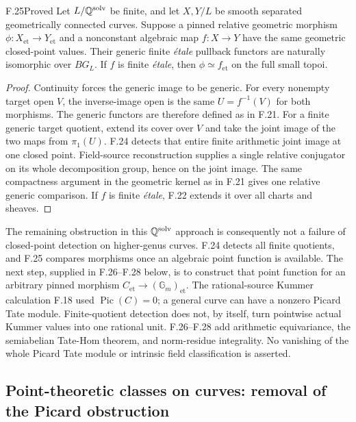 \begin{claim}{F.25}{Proved}
Let $L/\mathbb Q^{\mathrm{solv}}$ be finite, and let $X,Y/L$ be
smooth separated geometrically connected curves. Suppose a pinned
relative geometric morphism $\phi:X_{\mathrm{et}}\to
Y_{\mathrm{et}}$ and a nonconstant algebraic map $f:X\to Y$
have the same geometric closed-point values. Their generic
finite \emph{\'etale} pullback functors are naturally isomorphic
over $BG_L$. If $f$ is finite \emph{\'etale}, then
$\phi\simeq f_{\mathrm{et}}$ on the full small topoi.
\end{claim}
\begin{proof}
Continuity forces the generic image to be generic. For every
nonempty target open $V$, the inverse-image open is the same
$U=f^{-1}(V)$ for both morphisms. The generic functors are
therefore defined as in F.21. For a finite generic target
quotient, extend its cover over $V$ and take the joint image
of the two maps from $\pi_1(U)$. F.24 detects that entire
finite arithmetic joint image at one closed point. Field-source
reconstruction supplies a single relative conjugator on its
whole decomposition group, hence on the joint image. The same
compactness argument in the geometric kernel as in F.21 gives
one relative generic comparison. If $f$ is finite
\emph{\'etale}, F.22 extends it over all charts and sheaves.
\end{proof}

The remaining obstruction in this $\mathbb Q^{\mathrm{solv}}$ approach
is consequently not a failure of closed-point detection on
higher-genus curves. F.24 detects
all finite quotients, and F.25 compares morphisms once an
algebraic point function is available. The next step, supplied in F.26--F.28 below, is to construct
that point function for an arbitrary pinned morphism
$C_{\mathrm{et}}\to(\mathbb G_m)_{\mathrm{et}}$.
The rational-source Kummer calculation F.18 used
$\operatorname{Pic}(C)=0$; a general curve can have a nonzero
Picard Tate module. Finite-quotient detection does not, by
itself, turn pointwise actual Kummer values into one rational
unit. F.26--F.28 add arithmetic equivariance, the semiabelian
Tate-Hom theorem, and norm-residue integrality. No vanishing of
the whole Picard Tate module or intrinsic field classification
is asserted.

\subsection{Point-theoretic classes on curves: removal of the Picard obstruction}

